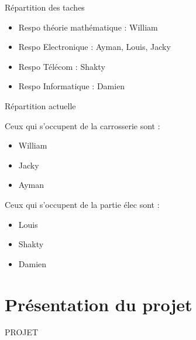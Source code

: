 \documentclass{beamer}
\begin{document}
	
	\begin{frame}{Répartition des taches}
		
		\begin{itemize}
			
			\item Respo théorie mathématique : William
			\item Respo Electronique : Ayman, Louis, Jacky
			\item Respo Télécom : Shakty
			\item Respo Informatique : Damien
		\end{itemize}

	\end{frame}


	\begin{frame}{Répartition actuelle}
		
		Ceux qui s'occupent de la carrosserie sont : 
		\begin{itemize}

			\item William
			\item Jacky
			\item Ayman
		\end{itemize}


		Ceux qui s'occupent de la partie élec sont :
		\begin{itemize}

			\item Louis
			\item Shakty
			\item Damien
		\end{itemize}
	\end{frame}




\section{Présentation du projet}
	
	\begin{frame}

		\begin{center}
			
			\Huge PROJET
		\end{center}
	\end{frame}
	
\end{document}
